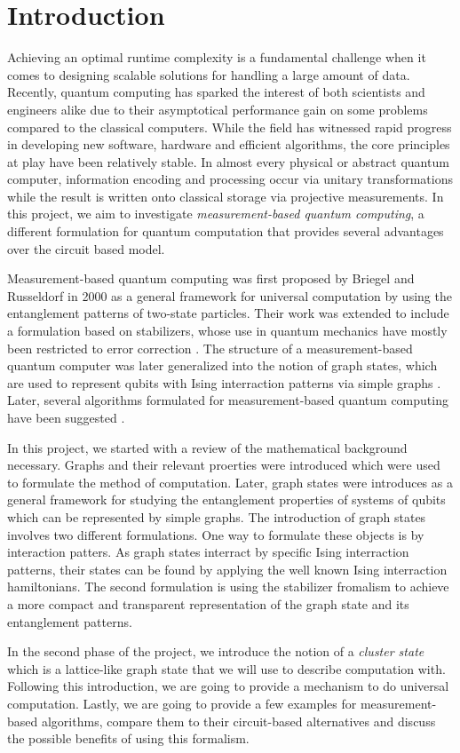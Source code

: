 \section{Introduction}

Achieving an optimal runtime complexity is a fundamental challenge when it comes to designing scalable solutions for handling a large amount of data\cite{sipser13}. Recently, quantum computing has sparked the interest of both scientists and engineers alike due to their asymptotical performance gain on some problems compared to the classical computers. While the field has witnessed rapid progress in developing new software, hardware and efficient algorithms, the core principles at play have been relatively stable. In almost every physical or abstract quantum computer, information encoding and processing occur via unitary transformations while the result is written onto classical storage via projective measurements\cite{Nielsen2009}. In this project, we aim to investigate \emph{measurement-based quantum computing}, a different formulation for quantum computation that provides several advantages over the circuit based model.

Measurement-based quantum computing was first proposed by Briegel and Russeldorf in 2000 \cite{Briegel_2001} as a general framework for universal computation  by using the entanglement patterns of two-state particles. Their work was extended to include a formulation based on stabilizers, whose use in quantum mechanics have mostly been restricted to error correction \cite{Nielsen2009, quant-ph/9705052}. The structure of a measurement-based quantum computer was later generalized into the notion of graph states, which are used to represent qubits with Ising interraction patterns via simple graphs \cite{hein2006}. Later, several algorithms formulated for measurement-based quantum computing have been suggested \cite{keith2014, debeaudrap2008theory}.

In this project, we started with a review of the mathematical background necessary. Graphs and their relevant proerties were introduced which were used to formulate the method of computation. Later, graph states were introduces as a general framework for studying the entanglement properties of systems of qubits which can be represented by simple graphs. The introduction of graph states involves two different formulations. One way to formulate these objects is by interaction patters. As graph states interract by specific Ising interraction patterns, their states can be found by applying the well known Ising interraction hamiltonians\cite{ichikawa2013}. The second formulation is using the stabilizer fromalism to achieve a more compact and transparent representation of the graph state and its entanglement patterns.

In the second phase of the project, we introduce the notion of a \emph{cluster state} which is a lattice-like graph state that we will use to describe computation with. Following this introduction, we are going to provide a mechanism to do universal computation. Lastly, we are going to provide a few examples for measurement-based algorithms, compare them to their circuit-based alternatives and discuss the possible benefits of using this formalism.